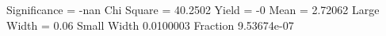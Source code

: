 Significance = -nan
Chi Square = 40.2502
Yield = -0
Mean = 2.72062
Large Width = 0.06
Small Width 0.0100003
Fraction 9.53674e-07
